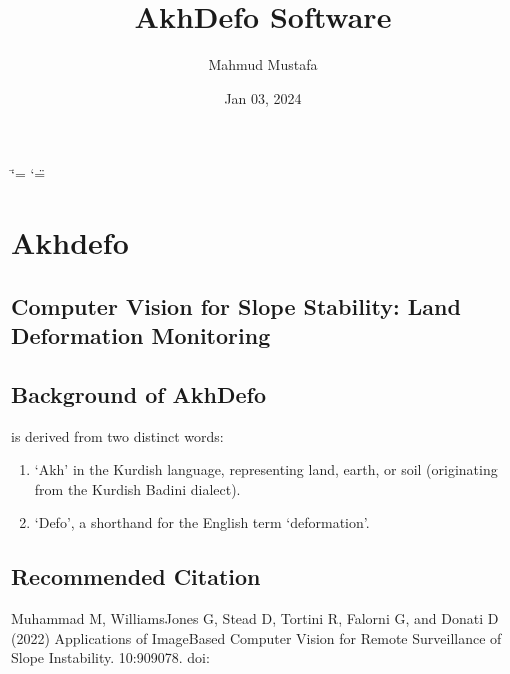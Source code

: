 \documentclass[letterpaper,10pt,english]{sphinxmanual}
\title{AkhDefo Software}
\date{Jan 03, 2024}
\author{Mahmud Mustafa}
\let\sphinxpxdimen\pdfpxdimen\else\newdimen\sphinxpxdimen
\begin{document}
\ifdefined\shorthandoff
  \ifnum\catcode`\=\string=\active\shorthandoff{=}\fi
  \ifnum\catcode`\"=\active{}\fi
\fi

\pagestyle{empty}
\sphinxmaketitle
\pagestyle{plain}
\sphinxtableofcontents
\pagestyle{normal}
\label{\detokenize{index::doc}}


\noindent{\hspace*{\fill}\sphinxincludegraphics[width=200\sphinxpxdimen]{{akhdefo_logo}.svg}}

\sphinxstepscope


\chapter{Akhdefo}
\label{\detokenize{README:akhdefo}}\label{\detokenize{README::doc}}



\section{Computer Vision for Slope Stability: Land Deformation Monitoring}
\label{\detokenize{README:computer-vision-for-slope-stability-land-deformation-monitoring}}

\section{Background of Akh\sphinxhyphen{}Defo}
\label{\detokenize{README:background-of-akh-defo}}
\sphinxAtStartPar
{} is derived from two distinct words:
\begin{enumerate}
%
\item {} 
\sphinxAtStartPar
‘Akh’ in the Kurdish language, representing land, earth, or soil (originating from the Kurdish Badini dialect).

\item {} 
\sphinxAtStartPar
‘Defo’, a shorthand for the English term ‘deformation’.

\end{enumerate}


\section{Recommended Citation}
\label{\detokenize{README:recommended-citation}}
\sphinxAtStartPar
Muhammad M, Williams\sphinxhyphen{}Jones G, Stead D, Tortini R, Falorni G, and Donati D (2022) Applications of Image\sphinxhyphen{}Based Computer Vision for Remote Surveillance of Slope Instability.  10:909078. doi: 
\end{document}

